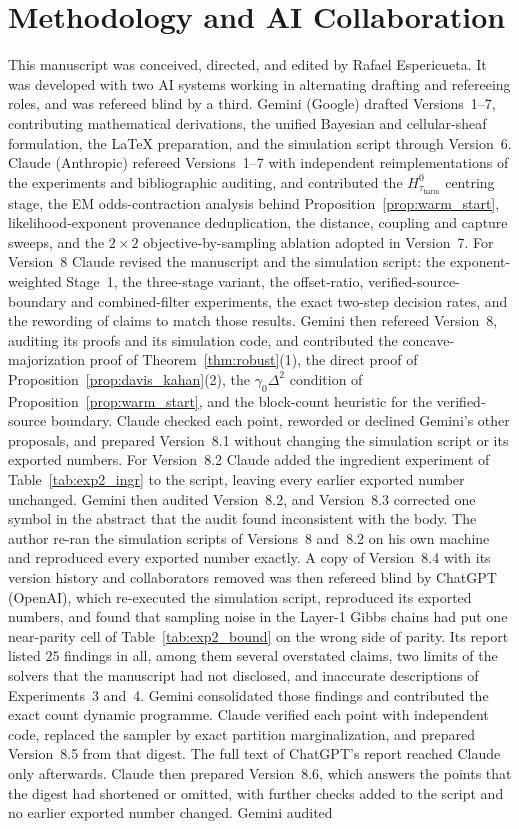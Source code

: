\documentclass[11pt,a4paper]{article}
\theoremstyle{definition}
\theoremstyle{remark}
\begin{document}
\section*{Methodology and AI Collaboration}
This manuscript was conceived, directed, and edited by Rafael Espericueta. It was developed with two AI systems working in alternating drafting and refereeing roles, and was refereed blind by a third. Gemini (Google) drafted Versions~1--7, contributing mathematical derivations, the unified Bayesian and cellular-sheaf formulation, the \LaTeX{} preparation, and the simulation script through Version~6. Claude (Anthropic) refereed Versions~1--7 with independent reimplementations of the experiments and bibliographic auditing, and contributed the $H^0_{\tau_{\mathrm{harm}}}$ centring stage, the EM odds-contraction analysis behind Proposition~\ref{prop:warm_start}, likelihood-exponent provenance deduplication, the distance, coupling and capture sweeps, and the $2 \times 2$ objective-by-sampling ablation adopted in Version~7. For Version~8 Claude revised the manuscript and the simulation script: the exponent-weighted Stage~1, the three-stage variant, the offset-ratio, verified-source-boundary and combined-filter experiments, the exact two-step decision rates, and the rewording of claims to match those results. Gemini then refereed Version~8, auditing its proofs and its simulation code, and contributed the concave-majorization proof of Theorem~\ref{thm:robust}(1), the direct proof of Proposition~\ref{prop:davis_kahan}(2), the $\gamma_0\Delta^2$ condition of Proposition~\ref{prop:warm_start}, and the block-count heuristic for the verified-source boundary. Claude checked each point, reworded or declined Gemini's other proposals, and prepared Version~8.1 without changing the simulation script or its exported numbers. For Version~8.2 Claude added the ingredient experiment of Table~\ref{tab:exp2_ingr} to the script, leaving every earlier exported number unchanged. Gemini then audited Version~8.2, and Version~8.3 corrected one symbol in the abstract that the audit found inconsistent with the body. The author re-ran the simulation scripts of Versions~8 and~8.2 on his own machine and reproduced every exported number exactly. A copy of Version~8.4 with its version history and collaborators removed was then refereed blind by ChatGPT (OpenAI), which re-executed the simulation script, reproduced its exported numbers, and found that sampling noise in the Layer-1 Gibbs chains had put one near-parity cell of Table~\ref{tab:exp2_bound} on the wrong side of parity. Its report listed $25$ findings in all, among them several overstated claims, two limits of the solvers that the manuscript had not disclosed, and inaccurate descriptions of Experiments~3 and~4. Gemini consolidated those findings and contributed the exact count dynamic programme. Claude verified each point with independent code, replaced the sampler by exact partition marginalization, and prepared Version~8.5 from that digest. The full text of ChatGPT's report reached Claude only afterwards. Claude then prepared Version~8.6, which answers the points that the digest had shortened or omitted, with further checks added to the script and no earlier exported number changed. Gemini audited 
\end{document}
